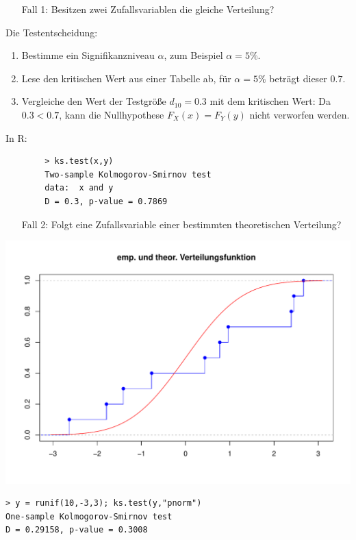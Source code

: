 \documentclass[t,11pt,aspectratio=169]{beamer}
\begin{document}
\begin{frame}[fragile]
	\begin{enumerate}
		\item[Fall 1:] Besitzen zwei Zufallsvariablen die gleiche Verteilung?
	\end{enumerate}
	Die Testentscheidung:
	\begin{enumerate}
		\item Bestimme ein Signifikanzniveau $\alpha$, zum Beispiel $\alpha=5\%$.
		\item Lese den kritischen Wert aus einer Tabelle ab, für $\alpha=5\%$ beträgt dieser $0.7$.
		\item Vergleiche den Wert der Testgröße $d_{10}=0.3$ mit dem kritischen Wert: Da $0.3<0.7$, kann die Nullhypothese $F_X(x)=F_Y(y)$ nicht verworfen werden.
	\end{enumerate}
\pause
	In R:
	\begin{verbatim}
		> ks.test(x,y)
		Two-sample Kolmogorov-Smirnov test
		data:  x and y
		D = 0.3, p-value = 0.7869
	\end{verbatim}
\end{frame}

\begin{frame}[fragile]
	\begin{enumerate}
		\item[Fall 2:] Folgt eine Zufallsvariable einer bestimmten theoretischen Verteilung?
	\end{enumerate}
	\begin{center}
		\includegraphics[scale=0.3]{Rplot02.pdf}
	\end{center}
\pause
\begin{verbatim}
> y = runif(10,-3,3); ks.test(y,"pnorm")
One-sample Kolmogorov-Smirnov test
D = 0.29158, p-value = 0.3008
\end{verbatim}
\end{frame}
\end{document}
